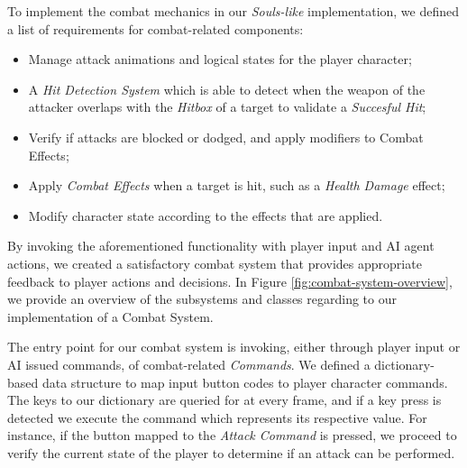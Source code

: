 To implement the combat mechanics in our \emph{Souls-like} implementation, we defined a list of requirements for combat-related components:
\begin{itemize}
    \item{Manage attack animations and logical states for the player character;}
    \item{A \emph{Hit Detection System} which is able to detect when the weapon of the attacker overlaps with the \emph{Hitbox} of a target to validate a \emph{Succesful Hit};}
    \item{Verify if attacks are blocked or dodged, and apply modifiers to Combat Effects;}
    \item{Apply \emph{Combat Effects} when a target is hit, such as a \emph{Health Damage} effect;}
    \item{Modify character state according to the effects that are applied.}
\end{itemize}
By invoking the aforementioned functionality with player input and AI agent actions, we created a satisfactory combat system that provides appropriate feedback to player actions and decisions. In Figure \ref{fig:combat-system-overview}, we provide an overview of the subsystems and classes regarding to our implementation of a Combat System.





The entry point for our combat system is invoking, either through player input or AI issued commands, of combat-related \emph{Commands}. We defined a dictionary-based data structure to map input button codes to player character commands. The keys to our dictionary are queried for at every frame, and if a key press is detected we execute the command which represents its respective value. For instance, if the button mapped to the \emph{Attack Command} is pressed, we proceed to verify the current state of the player to determine if an attack can be performed.

